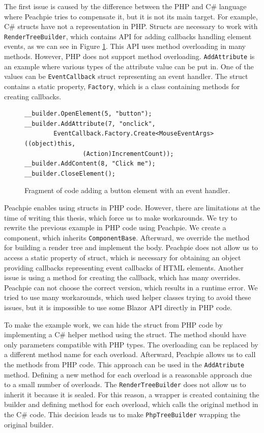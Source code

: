 The first issue is caused by the difference between the PHP and C\# language where Peachpie tries to compensate it, but it is not its main target. 
For example, C\# structs have not a representation in PHP.
Structs are necessary to work with \texttt{RenderTreeBuilder}, which contains API for adding callbacks handling element events, as we can see in Figure \ref{img14:callback}.
This API uses method overloading in many methods.
However, PHP does not support method overloading.
\texttt{AddAttribute} is an example where various types of the attribute value can be put in.
One of the values can be \texttt{EventCallback} struct representing an event handler.
The struct contains a static property, \texttt{Factory}, which is a class containing methods for creating callbacks.
\par
\begin{figure}[b!]
\begin{lstlisting}
__builder.OpenElement(5, "button");
__builder.AddAttribute(7, "onclick", 
		EventCallback.Factory.Create<MouseEventArgs>((object)this, 
				(Action)IncrementCount));
__builder.AddContent(8, "Click me");
__builder.CloseElement();
\end{lstlisting}
\caption{Fragment of code adding a button element with an event handler.}
\label{img14:callback}
\end{figure}
\par
Peachpie enables using structs in PHP code. 
However, there are limitations at the time of writing this thesis, which force us to make workarounds.
We try to rewrite the previous example in PHP code using Peachpie.
We create a component, which inherits \texttt{ComponentBase}. 
Afterward, we override the method for building a render tree and implement the body.
Peachpie does not allow us to access a static property of struct, which is necessary for obtaining an object providing callbacks representing event callbacks of HTML elements.
Another issue is using a method for creating the callback, which has many overrides.
Peachpie can not choose the correct version, which results in a runtime error.
We tried to use many workarounds, which used helper classes trying to avoid these issues, but it is impossible to use some Blazor API directly in PHP code.
\par
To make the example work, we can hide the struct from PHP code by implementing a C\# helper method using the struct.
The method should have only parameters compatible with PHP types. 
The overloading can be replaced by a different method name for each overload.
Afterward, Peachpie allows us to call the methods from PHP code.
This approach can be used in the \texttt{AddAtribute} method. 
Defining a new method for each overload is a reasonable approach due to a small number of overloads.
The \texttt{RenderTreeBuilder} does not allow us to inherit it because it is sealed.
For this reason, a wrapper is created containing the builder and defining method for each overload, which calls the original method in the C\# code.
This decision leads us to make \texttt{PhpTreeBuilder} wrapping the original builder.

